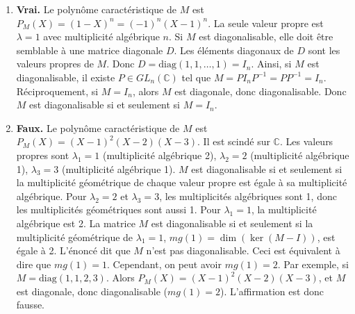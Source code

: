 \begin{solution}
\begin{enumerate}
    \item \textbf{Vrai.} Le polynôme caractéristique de $M$ est $P_M(X) = (1 - X)^n = (-1)^n(X-1)^n$. La seule valeur propre est $\lambda = 1$ avec multiplicité algébrique $n$.
    Si $M$ est diagonalisable, elle doit être semblable à une matrice diagonale $D$. Les éléments diagonaux de $D$ sont les valeurs propres de $M$. Donc $D = \text{diag}(1, 1, \dots, 1) = I_n$.
    Ainsi, si $M$ est diagonalisable, il existe $P \in GL_n(\mathbb{C})$ tel que $M = P I_n P^{-1} = P P^{-1} = I_n$.
    Réciproquement, si $M = I_n$, alors $M$ est diagonale, donc diagonalisable.
    Donc $M$ est diagonalisable si et seulement si $M = I_n$.

    \item \textbf{Faux.} Le polynôme caractéristique de $M$ est $P_M(X) = (X - 1)^2(X - 2)(X - 3)$. Il est scindé sur $\mathbb{C}$. Les valeurs propres sont $\lambda_1 = 1$ (multiplicité algébrique 2), $\lambda_2 = 2$ (multiplicité algébrique 1), $\lambda_3 = 3$ (multiplicité algébrique 1).
    $M$ est diagonalisable si et seulement si la multiplicité géométrique de chaque valeur propre est égale à sa multiplicité algébrique.
    Pour $\lambda_2 = 2$ et $\lambda_3 = 3$, les multiplicités algébriques sont 1, donc les multiplicités géométriques sont aussi 1.
    Pour $\lambda_1 = 1$, la multiplicité algébrique est 2. La matrice $M$ est diagonalisable si et seulement si la multiplicité géométrique de $\lambda_1 = 1$, $mg(1) = \dim(\ker(M-I))$, est égale à 2.
    L'énoncé dit que $M$ n'est pas diagonalisable. Ceci est équivalent à dire que $mg(1) = 1$.
    Cependant, on peut avoir $mg(1) = 2$. Par exemple, si $M = \text{diag}(1, 1, 2, 3)$. Alors $P_M(X) = (X-1)^2(X-2)(X-3)$, et $M$ est diagonale, donc diagonalisable ($mg(1)=2$).
    L'affirmation est donc fausse.


\end{enumerate}
\end{solution}
